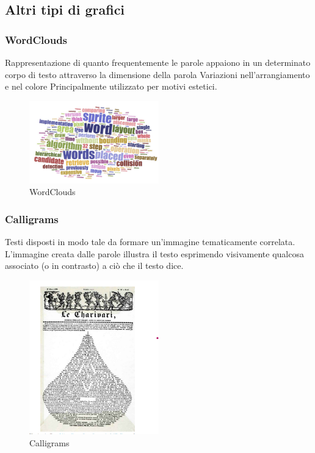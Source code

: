 \subsection{Altri tipi di grafici}
\subsubsection{WordClouds}
Rappresentazione di quanto frequentemente le parole appaiono in un determinato corpo di testo attraverso la dimensione della parola
Variazioni nell'arrangiamento e nel colore
Principalmente utilizzato per motivi estetici.
\begin{figure}[H]
    \centering
    \includegraphics[width=0.5\textwidth]{images/WordClouds.png} 
    \caption{WordClouds}
    \label{fig:immagine}
\end{figure}
\subsubsection{Calligrams}
Testi disposti in modo tale da formare un'immagine tematicamente correlata.
L'immagine creata dalle parole illustra il testo esprimendo visivamente qualcosa associato (o in contrasto) a ciò che il testo dice.
\begin{figure}[H]
    \centering
    \includegraphics[width=0.5\textwidth]{images/Calligrams.png} 
    \caption{Calligrams}
    \label{fig:immagine}
\end{figure}

